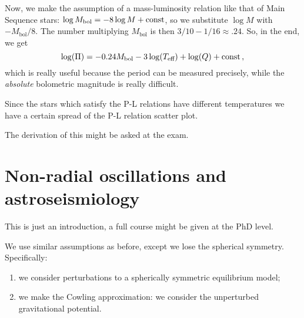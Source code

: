 \documentclass[main.tex]{subfiles}
\begin{document}
Now, we make the assumption of a mass-luminosity relation like that of Main Sequence stars: \(\log M _{\text{bol}} = - 8 \log M + \text{const}\), so we substitute \(\log M\) with \(- M _{\text{bol}} / 8\).
The number multiplying \(M _{\text{bol}}\) is then \(3/10 - 1/16 \approx \num{.24}\). So, in the end, we get
%
\begin{equation}
  \log(\Pi ) = \num{-0.24}M _{\text{bol}} - 3 \log(T _{\text{eff}}) + \log(Q) + \text{const}
\,,
\end{equation}
%
which is really useful because the period can be measured precisely, while the \emph{absolute} bolometric magnitude is really difficult.

Since the stars which satisfy the P-L relations have different temperatures we have a certain spread of the P-L relation scatter plot. 

The derivation of this might be asked at the exam.

\section{Non-radial oscillations and astroseismiology}

This is just an introduction, a full course might be given at the PhD level.

We use similar assumptions as before, except we lose the spherical symmetry. Specifically: 
\begin{enumerate}
  \item we consider perturbations to a spherically symmetric equilibrium model;
  \item we make the Cowling approximation: we consider the unperturbed gravitational potential.
\end{enumerate}
\end{document}
